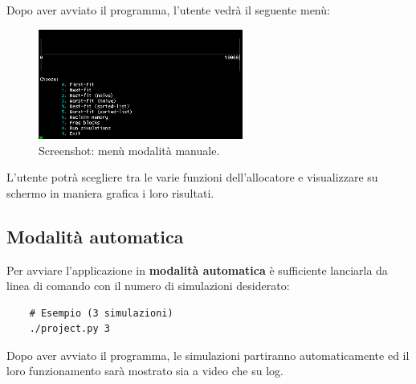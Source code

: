 \documentclass[12pt]{report}
\renewcommand\emph{\textbf}
\begin{document}
            Dopo aver avviato il programma, l'utente vedrà il seguente menù:

            \begin{figure}[H]
                \caption{Screenshot: menù modalità manuale.}
                \centering
                \includegraphics[width=0.6\textwidth]{scr1}
            \end{figure}

            L'utente potrà scegliere tra le varie funzioni dell'allocatore e visualizzare su schermo in maniera grafica i loro risultati.

        \subsection{Modalità automatica}

            Per avviare l'applicazione in \emph{modalità automatica} è sufficiente lanciarla da linea di comando con il numero di simulazioni desiderato:

            \begin{verbatim}
    # Esempio (3 simulazioni) 
    ./project.py 3
            \end{verbatim}

            Dopo aver avviato il programma, le simulazioni partiranno automaticamente ed il loro funzionamento sarà mostrato sia a video che su log.
\end{document}
